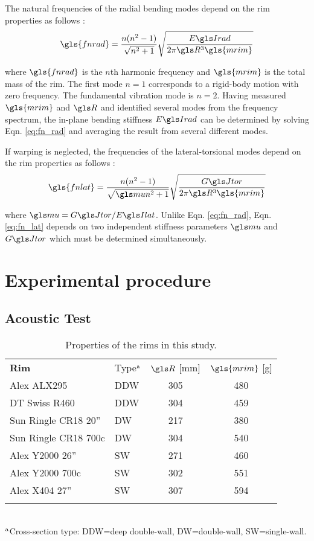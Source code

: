\documentclass[../thesis.tex]{subfiles}
\begin{document}
The natural frequencies of the radial bending modes depend on the rim properties as follows \cite{Timoshenko1955}:
  \begin{equation}\label{eq:fn_rad}
  \gls{fnrad} = \frac{n(n^2-1)}{\sqrt{n^2+1}} \sqrt{\frac{\EIr}{2\pi \R^3 \gls{mrim}}}
  \end{equation}

where $\gls{fnrad}$ is the $n$th harmonic frequency and $\gls{mrim}$ is the total mass of the rim. The first mode $n=1$ corresponds to a rigid-body motion with zero frequency. The fundamental vibration mode is $n=2$. Having measured $\gls{mrim}$ and $\R$ and identified several modes from the frequency spectrum, the in-plane bending stiffness $\EIr$ can be determined by solving Eqn. \eqref{eq:fn_rad} and averaging the result from several different modes.

If warping is neglected, the frequencies of the lateral-torsional modes depend on the rim properties as follows \cite{Timoshenko1955}:
  \begin{equation}\label{eq:fn_lat}
  \gls{fnlat} = \frac{n(n^2-1)}{\sqrt{\m n^2+1}} \sqrt{\frac{\GJ}{2\pi \R^3 \gls{mrim}}}
  \end{equation}

where $\m=\GJ/\EIl$. Unlike Eqn. \eqref{eq:fn_rad}, Eqn. \eqref{eq:fn_lat} depends on two independent stiffness parameters $\m$ and $\GJ$ which must be determined simultaneously.


\section{Experimental procedure}

\subsection{Acoustic Test}

  \begin{table}
  \caption{Properties of the rims in this study.\label{tb:rims}}
  \begin{tabular}{@{}llcc}
  \hline\noalign{\smallskip}
  \bf{Rim} & Type$^{\rm a}$ & $\R$ [mm] & $\gls{mrim}$ [g]\\
  \noalign{\smallskip}\hline\noalign{\smallskip}
  Alex ALX295          & DDW & 305 & 480\\
  DT Swiss R460        & DDW & 304 & 459\\
  Sun Ringle CR18 20'' & DW  & 217 & 380\\
  Sun Ringle CR18 700c & DW  & 304 & 540\\
  Alex Y2000 26''      & SW  & 271 & 460\\
  Alex Y2000 700c      & SW  & 302 & 551\\
  Alex X404 27''       & SW  & 307 & 594\\
  \noalign{\smallskip}\hline
  \end{tabular}\\
  $^{\rm a}$Cross-section type: DDW=deep double-wall, DW=double-wall, SW=single-wall.
  \end{table}
\end{document}
